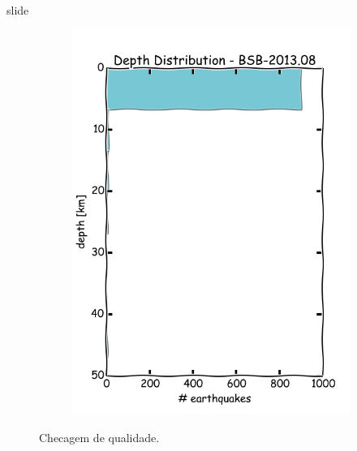 \documentclass[ucs,8pt]{beamer}
\begin{document}
\begin{frame}{slide}
\begin{figure}[H]
\begin{subfigure}[b]{0.4\textheight}
			\includegraphics[height=1.00\textheight]{dep_br_hist}
			\label{fig:br_dep_hist}
        \end{subfigure}%

  \caption{Checagem de qualidade.}
  \label{fig:qc_histograms} 
\end{figure}



\end{frame}
\end{document}

